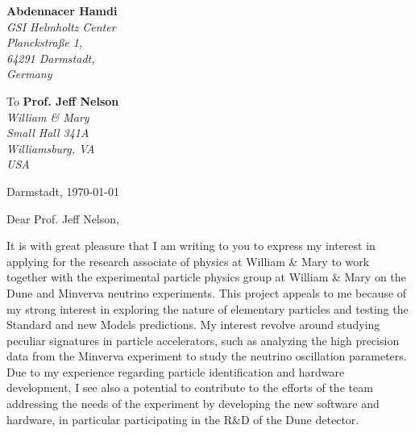 \documentclass[11pt]{letter}
\begin{document}
 \sffamily
 \hfill
 \begin{flushleft}
 {\bfseries Abdennacer Hamdi}\\[.35ex]
 \small\itshape
 GSI Helmholtz Center\\ %
 Planckstra{\ss}e 1,\\
 64291 Darmstadt,\\
 Germany\\ %
 \end{flushleft}
 \begin{flushleft}
 To {\bfseries Prof. Jeff Nelson}\\[.35ex]
 \small\itshape
 William \& Mary \\
 Small Hall 341A \\
 Williamsburg, VA  \\
 USA

 \end{flushleft}
 \hfill
 \begin{flushleft}
 Darmstadt, \today \\
 
 \end{flushleft}
\par Dear Prof. Jeff Nelson,
~\par It is with great pleasure that I am writing to you to express my interest in applying for the research associate of physics at William \& Mary to work together with the experimental particle physics group at William \& Mary on the Dune and Minverva neutrino experiments. This project appeals to me because of my strong interest in exploring the nature of elementary particles and testing the Standard and new Models predictions. My interest revolve around studying peculiar signatures in particle accelerators, such as analyzing the high precision data from the Minverva experiment to study the neutrino oscillation parameters. Due to my experience regarding particle identification and hardware development, I see also a potential to contribute to the efforts of the team addressing the needs of the experiment by developing the new software and hardware, in particular participating in the R\&D of the Dune detector.
\end{document}
